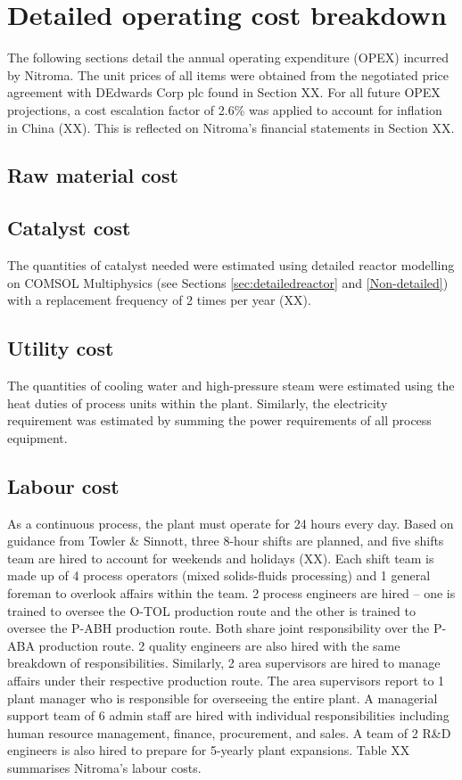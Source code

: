 \section{Detailed operating cost breakdown}
The following sections detail the annual operating expenditure (OPEX) incurred by Nitroma. The unit prices of all items were obtained from the negotiated price agreement with DEdwards Corp plc found in Section XX. For all future OPEX projections, a cost escalation factor of 2.6\% was applied to account for inflation in China (XX). This is reflected on Nitroma’s financial statements in Section XX.

\subsection{Raw material cost}
\label{sec:opex-raw-material}

\subsection{Catalyst cost}
 The quantities of catalyst needed were estimated using detailed reactor modelling on COMSOL Multiphysics (see Sections \ref{sec:detailedreactor} and \ref{Non-detailed}) with a replacement frequency of 2 times per year (XX).

\subsection{Utility cost}
 The quantities of cooling water and high-pressure steam were estimated using the heat duties of process units within the plant. Similarly, the electricity requirement was estimated by summing the power requirements of all process equipment.  

\subsection{Labour cost}
As a continuous process, the plant must operate for 24 hours every day. Based on guidance from Towler \& Sinnott, three 8-hour shifts are planned, and five shifts team are hired to account for weekends and holidays (XX). Each shift team is made up of 4 process operators (mixed solids-fluids processing) and 1 general foreman to overlook affairs within the team. 2 process engineers are hired – one is trained to oversee the O-TOL production route and the other is trained to oversee the P-ABH production route. Both share joint responsibility over the P-ABA production route. 2 quality engineers are also hired with the same breakdown of responsibilities.  Similarly, 2 area supervisors are hired to manage affairs under their respective production route. The area supervisors report to 1 plant manager who is responsible for overseeing the entire plant. A managerial support team of 6 admin staff are hired with individual responsibilities including human resource management, finance, procurement, and sales. A team of 2 R\&D engineers is also hired to prepare for 5-yearly plant expansions. Table XX summarises Nitroma's labour costs.


